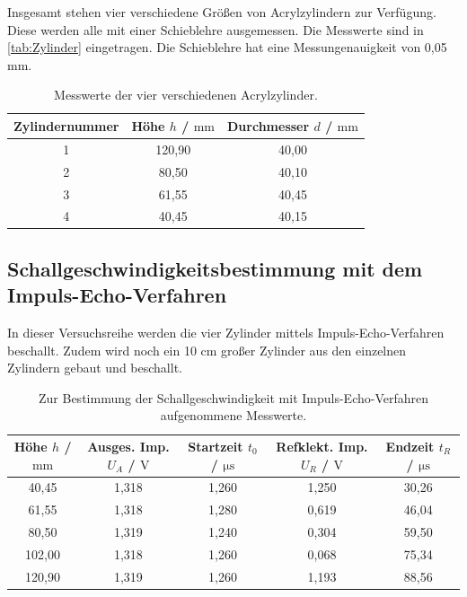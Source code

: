 Insgesamt stehen vier verschiedene Größen von Acrylzylindern zur Verfügung. Diese werden alle mit einer Schieblehre
ausgemessen. Die Messwerte sind in \autoref{tab:Zylinder} eingetragen. Die Schieblehre hat eine Messungenauigkeit von
0,05 mm.

\begin{table}
  \centering
  \caption{Messwerte der vier verschiedenen Acrylzylinder.}
  \label{tab:Zylinder}
  \begin{tabular}{c | c c}
    Zylindernummer & Höhe $h$ / $\si{\milli\meter}$ & Durchmesser $d$ / $\si{\milli\meter}$ \\
       \midrule
        1 & 120,90 & 40,00 \\
        2 & 80,50  & 40,10 \\
        3 & 61,55  & 40,45 \\
        4 & 40,45  & 40,15 \\
      \bottomrule
    \end{tabular}
\end{table}

\subsection{Schallgeschwindigkeitsbestimmung mit dem Impuls-Echo-Verfahren}

In dieser Versuchsreihe werden die vier Zylinder mittels Impuls-Echo-Verfahren beschallt. Zudem wird noch
ein 10 cm großer Zylinder aus den einzelnen Zylindern gebaut und beschallt.

\begin{table}
  \centering
  \caption{Zur Bestimmung der Schallgeschwindigkeit mit Impuls-Echo-Verfahren aufgenommene Messwerte.}
  \label{tab:EchoImpuls}
  \begin{tabular}{c | c c c c}
    Höhe $h$ / $\si{\milli\meter}$ & Ausges. Imp. $U_A$ / $\si{\volt}$ &  Startzeit $t_0$ / $\si{\micro\second}$ & Refklekt. Imp. $U_R$ / $\si{\volt}$ & Endzeit $t_R$ / $\si{\micro\second}$ \\
       \midrule
        40,45 & 1,318 & 1,260 & 1,250 & 30,26 \\
        61,55 & 1,318 & 1,280 & 0,619 & 46,04 \\
        80,50 & 1,319 & 1,240 & 0,304 & 59,50 \\
        102,00 & 1,318 & 1,260 & 0,068 & 75,34 \\
        120,90 & 1,319 & 1,260 & 1,193 & 88,56 \\
      \bottomrule
    \end{tabular}
\end{table}


